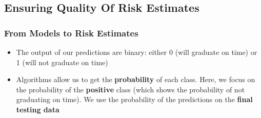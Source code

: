 \documentclass{article}
\begin{document}
\subsection{Ensuring Quality Of Risk 
Estimates}
\subsubsection{From Models to Risk Estimates}
\begin{itemize}
\item The output of our predictions are binary: either 0 (will graduate on time) or 1 (will not graduate on time)
\item Algorithms allow us to get the  \textbf{probability} of each class. Here, we focus on the probability of the \textbf{positive} class (which shows the probability of not graduating on time). We use the probability of the predictions on the \textbf{final testing data }
\end{itemize}
\end{document}
